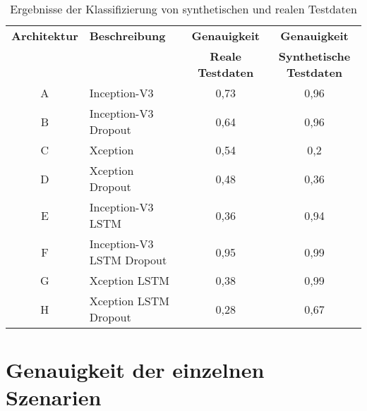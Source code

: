 \begin{table}[h]
\small
\centering
\def\arraystretch{1.4}
\begin{tabular}{c p{3cm} c c}
\textbf{Architektur} & \textbf{Beschreibung} & \textbf{Genauigkeit} & \textbf{Genauigkeit} \\
 & & \textbf{Reale Testdaten} & \textbf{Synthetische Testdaten} \\
\hline
A & Inception-V3 & 0,73 & 0,96 \\
\hline
B & Inception-V3 \newline Dropout & 0,64 & 0,96 \\
\hline
C & Xception & 0,54 & 0,2 \\
\hline
D & Xception \newline Dropout & 0,48 & 0,36 \\
\hline 
E & Inception-V3 \newline LSTM & 0,36 & 0,94 \\
\hline
F & Inception-V3 \newline LSTM \newline Dropout & 0,95 & 0,99 \\
\hline
G & Xception \newline LSTM & 0,38 & 0,99 \\
\hline
H & Xception \newline LSTM \newline Dropout & 0,28 & 0,67 \\
\hline
\end{tabular}
\caption{Ergebnisse der Klassifizierung von synthetischen und realen Testdaten}
\label{tab_ergebnis_synth}
\end{table}


\section{Genauigkeit der einzelnen Szenarien}
\label{ergebnis_szenarien}


